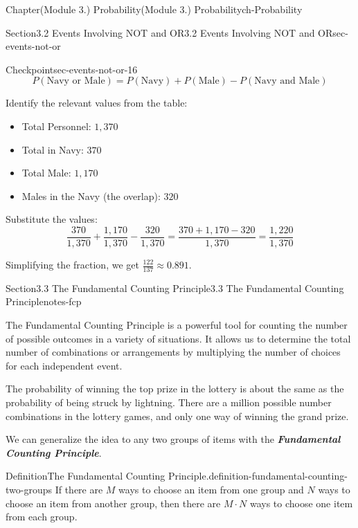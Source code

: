 \documentclass[oneside,10pt,]{book}
\newcommand{\ptxlistdisc}{\raisebox{0.3ex}{\textbullet}}
\newcommand{\alert}[1]{\textbf{\textit{#1}}}
\begin{document}
\begin{chapterptx}{Chapter}{(Module 3.) Probability}{}{(Module 3.) Probability}{}{}{ch-Probability}
\begin{sectionptx}{Section}{3.2 Events Involving NOT and OR}{}{3.2 Events Involving NOT and OR}{}{}{sec-events-not-or}
\begin{inlineexercise}{Checkpoint}{}{sec-events-not-or-16}
\begin{equation*}
P(\text{Navy or Male}) = P(\text{Navy}) + P(\text{Male}) - P(\text{Navy and Male})
\end{equation*}
%
\par
Identify the relevant values from the table:%
\begin{itemize}[label=\ptxlistdisc]
\item{}Total Personnel: \(1,370\)%
\item{}Total in Navy: \(370\)%
\item{}Total Male: \(1,170\)%
\item{}Males in the Navy (the overlap): \(320\)%
\end{itemize}
%
\par
Substitute the values:%
\begin{equation*}
\frac{370}{1,370} + \frac{1,170}{1,370} - \frac{320}{1,370} = \frac{370 + 1,170 - 320}{1,370} = \frac{1,220}{1,370}
\end{equation*}
%
\par
Simplifying the fraction, we get \(\frac{122}{137} \approx 0.891\).%
\end{inlineexercise}%
\end{sectionptx}
%
%
\typeout{************************************************}
\typeout{************************************************}
%
\begin{sectionptx}{Section}{3.3 The Fundamental Counting Principle}{}{3.3 The Fundamental Counting Principle}{}{}{notes-fcp}
\begin{introduction}{}%
The Fundamental Counting Principle is a powerful tool for counting the number of possible outcomes in a variety of situations. It allows us to determine the total number of combinations or arrangements by multiplying the number of choices for each independent event.%
\end{introduction}%
The probability of winning the top prize in the lottery is about the same as the probability of being struck by lightning. There are a million possible number combinations in the lottery games, and only one way of winning the grand prize.%
\par
We can generalize the idea to any two groups of items with the \alert{Fundamental Counting Principle}.%
\begin{definition}{Definition}{The Fundamental Counting Principle.}{definition-fundamental-counting-two-groups}%
If there are \(M\) ways to choose an item from one group and \(N\) ways to choose an item from another group, then there are \(M \cdot N\) ways to choose one item from each group.%

\end{definition}
\end{sectionptx}
\end{chapterptx}
\end{document}
